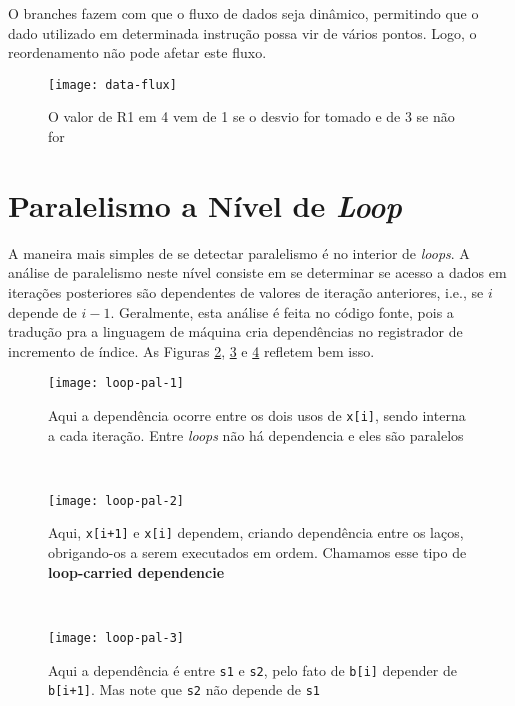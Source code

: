 O branches fazem com que o fluxo de dados seja dinâmico, permitindo que o dado utilizado em determinada instrução possa vir de vários pontos. Logo, o reordenamento não pode afetar este fluxo.

\begin{figure}[ht]
  \centering
  \texttt{[image: data-flux]}
  \caption{O valor de R1 em 4 vem de 1 se o desvio for tomado e de 3 se não for}
  \label{fig:data-flux}
\end{figure}




\section{Paralelismo a Nível de \textit{Loop}}
A maneira mais simples de se detectar paralelismo é no interior de \textit{loops}. A análise de paralelismo neste nível consiste em se determinar se acesso a dados em iterações posteriores são dependentes de valores de iteração anteriores, i.e., se $i$ depende de $i-1$. Geralmente, esta análise é feita no código fonte, pois a tradução pra a linguagem de máquina cria dependências no registrador de incremento de índice. As Figuras \ref{fig:loop-pal-1}, \ref{fig:loop-pal-2} e \ref{fig:loop-pal-3} refletem bem isso.

\begin{figure*}
  \begin{subfigure}{.45\textwidth}
    \centering
    \texttt{[image: loop-pal-1]}
    \caption{Aqui a dependência ocorre entre os dois usos de \texttt{x{[i]}}, sendo interna a cada iteração. Entre \textit{loops} não há dependencia e eles são paralelos}
    \label{fig:loop-pal-1}
  \end{subfigure}
  ~
  \begin{subfigure}{.45\textwidth}
    \centering
    \texttt{[image: loop-pal-2]}
    \caption{Aqui, \texttt{x{[i+1]}} e \texttt{x{[i]}} dependem, criando dependência entre os laços, obrigando-os a serem executados em ordem. Chamamos esse tipo de \textbf{loop-carried dependencie}}
    \label{fig:loop-pal-2}
  \end{subfigure}
  ~
  \begin{subfigure}{\textwidth}
    \centering
    \texttt{[image: loop-pal-3]}
    \caption{Aqui a dependência é entre \texttt{s1} e \texttt{s2}, pelo fato de \texttt{b{[i]}} depender de \texttt{b{[i+1]}}. Mas note que \texttt{s2} não depende de \texttt{s1}}
    \label{fig:loop-pal-3}
  \end{subfigure}

  \caption{Avaliações de paralelismo a nível de \textit{loop}}
\end{figure*}

